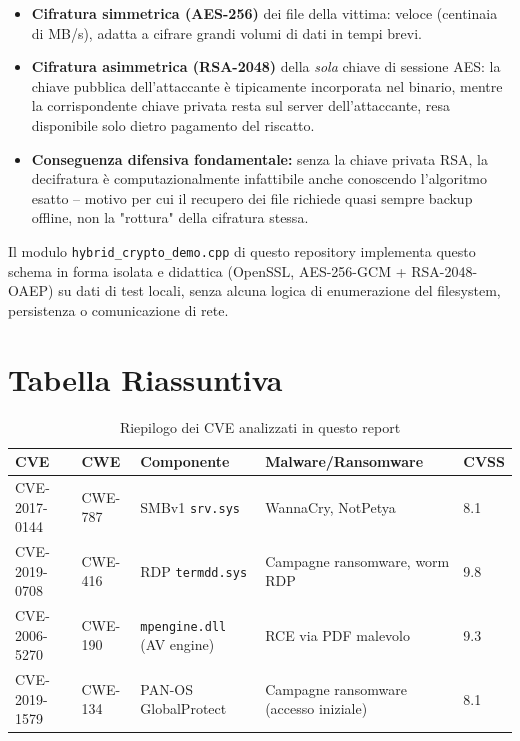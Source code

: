 \documentclass[11pt,a4paper]{article}
\begin{document}
\begin{itemize}[leftmargin=*]
    \item \textbf{Cifratura simmetrica (AES-256)} dei file della vittima: veloce (centinaia di MB/s), adatta a cifrare grandi volumi di dati in tempi brevi.
    \item \textbf{Cifratura asimmetrica (RSA-2048)} della \emph{sola} chiave di sessione AES: la chiave pubblica dell'attaccante è tipicamente incorporata nel binario, mentre la corrispondente chiave privata resta sul server dell'attaccante, resa disponibile solo dietro pagamento del riscatto.
    \item \textbf{Conseguenza difensiva fondamentale:} senza la chiave privata RSA, la decifratura è computazionalmente infattibile anche conoscendo l'algoritmo esatto -- motivo per cui il recupero dei file richiede quasi sempre backup offline, non la "rottura" della cifratura stessa.
\end{itemize}

Il modulo \texttt{hybrid\_crypto\_demo.cpp} di questo repository implementa questo schema in forma isolata e didattica (OpenSSL, AES-256-GCM + RSA-2048-OAEP) su dati di test locali, senza alcuna logica di enumerazione del filesystem, persistenza o comunicazione di rete.

\section{Tabella Riassuntiva}

\begin{table}[h]
\centering
\small
\begin{tabular}{@{}p{2.2cm}p{1.6cm}p{3.3cm}p{3.3cm}p{2.8cm}@{}}
\toprule
\textbf{CVE} & \textbf{CWE} & \textbf{Componente} & \textbf{Malware/Ransomware} & \textbf{CVSS} \\
\midrule
CVE-2017-0144 & CWE-787 & SMBv1 \texttt{srv.sys} & WannaCry, NotPetya & 8.1 \\
CVE-2019-0708 & CWE-416 & RDP \texttt{termdd.sys} & Campagne ransomware, worm RDP & 9.8 \\
CVE-2006-5270 & CWE-190 & \texttt{mpengine.dll} (AV engine) & RCE via PDF malevolo & 9.3 \\
CVE-2019-1579 & CWE-134 & PAN-OS GlobalProtect & Campagne ransomware (accesso iniziale) & 8.1 \\
\bottomrule
\end{tabular}
\caption{Riepilogo dei CVE analizzati in questo report}
\end{table}
\end{document}

